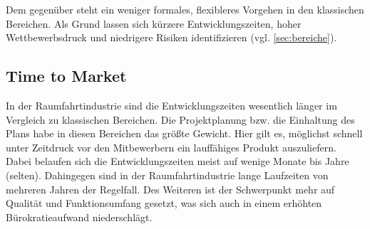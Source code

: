 Dem gegenüber steht ein weniger formales, flexibleres Vorgehen in den klassischen Bereichen. 
Als Grund lassen sich kürzere Entwicklungszeiten, hoher Wettbewerbsdruck und niedrigere Risiken identifizieren (vgl. \autoref{sec:bereiche}).


\subsection{Time to Market} %

In der Raumfahrtindustrie sind die Entwicklungszeiten wesentlich länger im Vergleich zu klassischen Bereichen.
Die Projektplanung bzw. die Einhaltung des Plans habe in diesen Bereichen das größte Gewicht. 
Hier gilt es, möglichst schnell unter Zeitdruck vor den Mitbewerbern ein lauffähiges Produkt auszuliefern.
Dabei belaufen sich die Entwicklungszeiten meist auf wenige Monate bis Jahre (selten).
Dahingegen sind in der Raumfahrtindustrie lange Laufzeiten von mehreren Jahren der Regelfall.
Des Weiteren ist der Schwerpunkt mehr auf Qualität und Funktionsumfang gesetzt, was sich auch in einem erhöhten Bürokratieaufwand niederschlägt.
\parencite[Vgl.][S. 97]{Dorfman:1999aa}


